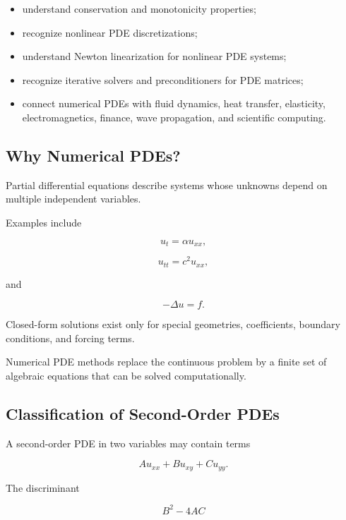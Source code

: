 {\begin{itemize}
    \item understand conservation and monotonicity properties;
    \item recognize nonlinear PDE discretizations;
    \item understand Newton linearization for nonlinear PDE systems;
    \item recognize iterative solvers and preconditioners for PDE matrices;
    \item connect numerical PDEs with fluid dynamics, heat transfer,
          elasticity, electromagnetics, finance, wave propagation, and
          scientific computing.
\end{itemize}
}

\subsection{Why Numerical PDEs?}
\label{subsec:why-numerical-pdes}

Partial differential equations describe systems whose unknowns depend on
multiple independent variables.

Examples include

\[
\boxed{
u_t=\alpha u_{xx},
}
\]

\[
\boxed{
u_{tt}=c^2u_{xx},
}
\]

and

\[
\boxed{
-\Delta u=f.
}
\]

Closed-form solutions exist only for special geometries, coefficients,
boundary conditions, and forcing terms.

Numerical PDE methods replace the continuous problem by a finite set of
algebraic equations that can be solved computationally.

\subsection{Classification of Second-Order PDEs}
\label{subsec:pde-classification-numerical}

A second-order PDE in two variables may contain terms

\[
A u_{xx}
+
B u_{xy}
+
C u_{yy}.
\]

The discriminant

\[
\boxed{
B^2-4AC
}
\]

